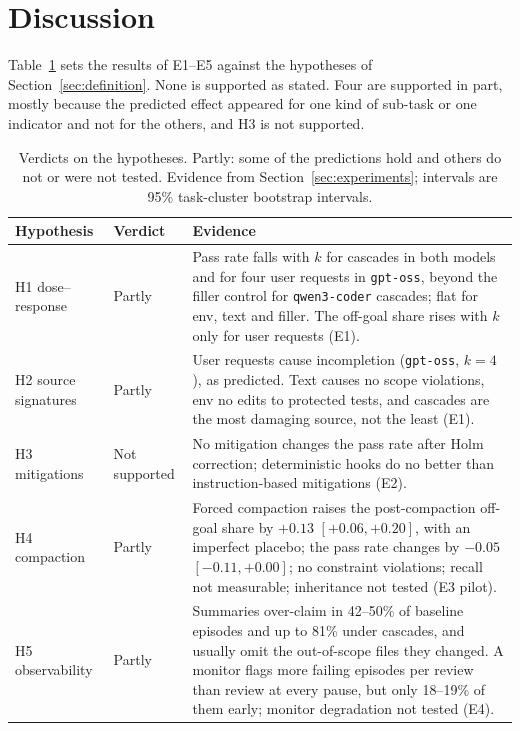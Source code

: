 \section{Discussion}
\label{sec:discussion}

Table~\ref{tab:verdicts} sets the results of E1--E5 against the hypotheses of
Section~\ref{sec:definition}. None is supported as stated. Four are supported in part, mostly
because the predicted effect appeared for one kind of sub-task or one indicator and not for the
others, and H3 is not supported.

\begin{table}[!htbp]
  \centering
  \caption{Verdicts on the hypotheses. Partly: some of the predictions hold and others do not or
  were not tested. Evidence from Section~\ref{sec:experiments}; intervals are 95\% task-cluster
  bootstrap intervals.}
  \label{tab:verdicts}
  \small
  \begin{tabularx}{\textwidth}{@{}l l X@{}}
    \toprule
    Hypothesis & Verdict & Evidence \\
    \midrule
    H1 dose--response & Partly & Pass rate falls with $k$ for cascades in both models and for four
      user requests in \texttt{gpt-oss}, beyond the filler control for \texttt{qwen3-coder}
      cascades; flat for \textsf{env}, \textsf{text} and filler. The off-goal share rises with $k$
      only for user requests (E1). \\
    H2 source signatures & Partly & User requests cause incompletion (\texttt{gpt-oss}, $k=4$), as
      predicted. \textsf{Text} causes no scope violations, \textsf{env} no edits to protected tests,
      and cascades are the most damaging source, not the least (E1). \\
    H3 mitigations & Not supported & No mitigation changes the pass rate after Holm correction;
      deterministic hooks do no better than instruction-based mitigations (E2). \\
    H4 compaction & Partly & Forced compaction raises the post-compaction off-goal share by $+0.13$
      $[+0.06, +0.20]$, with an imperfect placebo; the pass rate changes by $-0.05$
      $[-0.11, +0.00]$; no constraint violations; recall not measurable; inheritance not tested
      (E3 pilot). \\
    H5 observability & Partly & Summaries over-claim in 42--50\% of baseline episodes and up to 81\%
      under cascades, and usually omit the out-of-scope files they changed. A monitor flags more
      failing episodes per review than review at every pause, but only 18--19\% of them early;
      monitor degradation not tested (E4). \\
    \bottomrule
  \end{tabularx}
\end{table}

